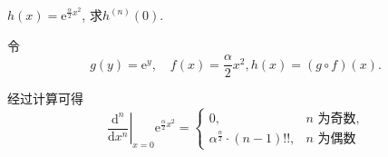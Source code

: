 \begin{example}
  $h\left( x \right) = \mathrm{e}^{\frac{\alpha}{2} x^{2}}$, 求$h^{(n)} (0)$.
  
  令
  \begin{equation}
    g(y) = \mathrm{e}^{y}, \quad f(x) = \frac{\alpha}{2} x^{2}, h\left( x \right) = \left( g\circ f \right) (x).
  \end{equation}

  经过计算可得
  \begin{equation}
    \left. \frac{\mathrm{d}^n}{\mathrm{d} x^n} \right|_{x = 0} \mathrm{e}^{ \frac{\alpha}{2} x^{2}} = \begin{cases} 
      0, & n\text{ 为奇数,} 
      \\ 
      \alpha ^{\frac{n}{2}} \cdot \left( n -1 \right) !!, & n \text{ 为偶数} 
    \end{cases}
  \end{equation}
\end{example}